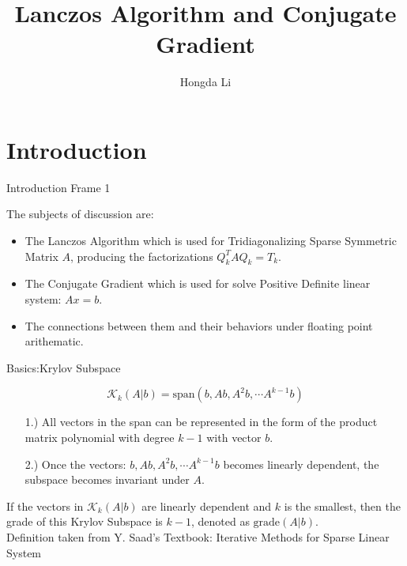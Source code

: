 \documentclass{beamer}
\title[Lanczos and CG]{Lanczos Algorithm and Conjugate Gradient}
\author[Hongda Li, UW]{Hongda Li}
\institute[]
{
    {
        \small Applied Mathematics, University of Washington
    }\\
        \vspace{1cm}
    {
        \small {\color{blue}Presented for Something}
    }\\
        \vspace{1cm}
        Still a Draft
}
\date[May ??th 2022]
\begin{document}
\maketitle

\section{Introduction}
    \begin{frame}{Introduction Frame 1}
        \par
        The subjects of discussion are: 
        \begin{itemize}
            \item The Lanczos Algorithm which is used for Tridiagonalizing Sparse Symmetric Matrix $A$, producing the factorizations $Q_k^TAQ_k = T_k$. 
            \item The Conjugate Gradient which is used for solve Positive Definite linear system: $Ax = b$. 
            \item The connections between them and their behaviors under floating point arithematic. 
        \end{itemize}
    \end{frame}


    \begin{frame}{Basics:Krylov Subspace}
        \begin{definition}
            $$
            \mathcal{K}_k(A|b) = \text{span}( b, Ab, A^2b, \cdots A^{k - 1}b)
            $$
            \begin{itemize}
                \item [1.)] All vectors in the span can be represented in the form of the product matrix polynomial with degree $k - 1$ with vector $b$. 
                \item [2.)] Once the vectors: $b, Ab, A^2b, \cdots A^{k - 1}b$ becomes linearly dependent, the subspace becomes invariant under $A$. 
            \end{itemize}
        \end{definition}
        \begin{definition}
            If the vectors in $\mathcal K_{k}(A|b)$ are linearly dependent and $k$ is the smallest, then the grade of this Krylov Subspace is $k - 1$, denoted as $\text{grade}(A|b)$. 
            \\
            Definition taken from Y. Saad's Textbook: Iterative Methods for Sparse Linear System \cite{book:saad_sparse_linear}
        \end{definition}
    \end{frame}
    
\end{document}
